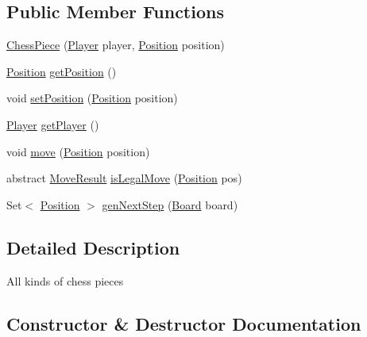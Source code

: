 \subsection*{Public Member Functions}
\begin{DoxyCompactItemize}
\item 
\mbox{\hyperlink{classchess_1_1models_1_1_chess_piece_a59beae5e1f384747a201a4c417ca0afb}{Chess\+Piece}} (\mbox{\hyperlink{enumchess_1_1models_1_1enums_1_1_player}{Player}} player, \mbox{\hyperlink{classchess_1_1models_1_1_position}{Position}} position)
\item 
\mbox{\hyperlink{classchess_1_1models_1_1_position}{Position}} \mbox{\hyperlink{classchess_1_1models_1_1_chess_piece_a4ce783eeb2ec6d5cd83af05c11fe8cdb}{get\+Position}} ()
\item 
void \mbox{\hyperlink{classchess_1_1models_1_1_chess_piece_a2e3c62bde5041ca0aa53e0476cc8b600}{set\+Position}} (\mbox{\hyperlink{classchess_1_1models_1_1_position}{Position}} position)
\item 
\mbox{\hyperlink{enumchess_1_1models_1_1enums_1_1_player}{Player}} \mbox{\hyperlink{classchess_1_1models_1_1_chess_piece_aaa3cef5d52e4a228dc01f91133a6c437}{get\+Player}} ()
\item 
void \mbox{\hyperlink{classchess_1_1models_1_1_chess_piece_a77865fbd52257338c4e376af525155c7}{move}} (\mbox{\hyperlink{classchess_1_1models_1_1_position}{Position}} position)
\item 
abstract \mbox{\hyperlink{enumchess_1_1models_1_1enums_1_1_move_result}{Move\+Result}} \mbox{\hyperlink{classchess_1_1models_1_1_chess_piece_a60088166dd440bf51de4514c3e57841e}{is\+Legal\+Move}} (\mbox{\hyperlink{classchess_1_1models_1_1_position}{Position}} pos)
\item 
Set$<$ \mbox{\hyperlink{classchess_1_1models_1_1_position}{Position}} $>$ \mbox{\hyperlink{classchess_1_1models_1_1_chess_piece_afd359313e83bdef860f9f8236435522f}{gen\+Next\+Step}} (\mbox{\hyperlink{classchess_1_1models_1_1_board}{Board}} board)
\end{DoxyCompactItemize}


\subsection{Detailed Description}
All kinds of chess pieces 

\subsection{Constructor \& Destructor Documentation}
\mbox{\label{classchess_1_1models_1_1_chess_piece_a59beae5e1f384747a201a4c417ca0afb}} 
